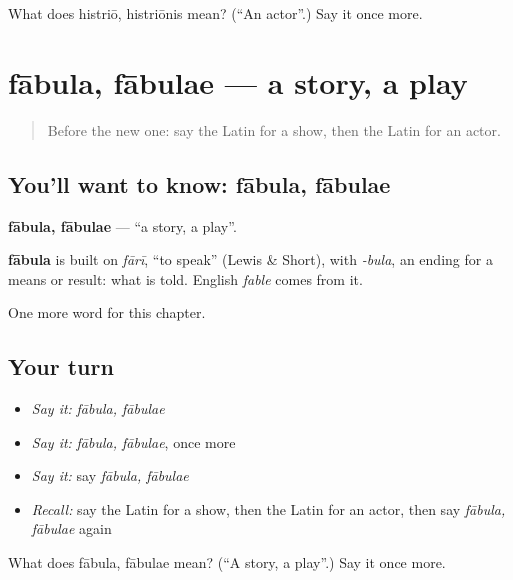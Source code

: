 \begin{tcolorbox}[breakable,colback=teal!4,colframe=teal!35!black,title={Before you move on}]
What does histriō, histriōnis mean? (\textquotedblleft{}An actor\textquotedblright{}.) Say it once more.
\end{tcolorbox}
\section[fābula, fābulae]{fābula, fābulae — a story, a play}

\label{lesson:LA-C219-fabula}



\begin{quote}
Before the new one: say the Latin for a show, then the Latin for an actor.
\end{quote}

\subsection*{You'll want to know: fābula, fābulae}
\textbf{fābula, fābulae} — \textquotedblleft{}a story, a play\textquotedblright{}.

\begin{cousinweb}
\textbf{fābula} is built on \emph{fārī}, \textquotedblleft{}to speak\textquotedblright{} (Lewis \& Short), with \emph{-bula}, an ending for a means or result: what is told. English \emph{fable} comes from it.
\end{cousinweb}

\begin{grammarlens}[title={What you've built}]
One more word for this chapter.
\end{grammarlens}

\subsection*{Your turn}
\begin{itemize}
\raggedright
  \item \emph{Say it:} \emph{fābula, fābulae}
  \item \emph{Say it:} \emph{fābula, fābulae}, once more
  \item \emph{Say it:} say \emph{fābula, fābulae}
  \item \emph{Recall:} say the Latin for a show, then the Latin for an actor, then say \emph{fābula, fābulae} again
\end{itemize}

\begin{tcolorbox}[breakable,colback=teal!4,colframe=teal!35!black,title={Before you move on}]
What does fābula, fābulae mean? (\textquotedblleft{}A story, a play\textquotedblright{}.) Say it once more.
\end{tcolorbox}
